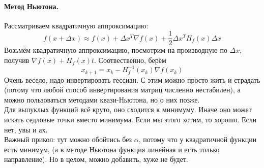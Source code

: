 \documentclass{article}
\begin{document}
    \paragraph{Метод Ньютона.}
    Рассматриваем квадратичную аппроксимацию:
    \[
    f(x+\Delta x)\approx f(x)+\Delta x^T\nabla f(x)+\frac12\Delta x^TH_f(x)\Delta x
    \]
    Возьмём квадратичную аппроксимацию, посмотрим на производную по $\Delta x$, получив $\nabla f(x)+H_f(x)t$. Соотвественно, берём
    \[
    x_{k+1}=x_k-H_f^{-1}(x_k)\nabla f(x_k)
    \]
    Очень весело, надо инвертировать гессиан. С этим можно просто жить и страдать (потому что любой способ инвертирования матриц численно нестабилен), а можно пользоваться методами квази-Ньютона, но о них позже.\\
    Для выпуклых функций всё круто, оно сходится к минимуму. Иначе оно может искать седловые точки вместо минимума. Если мы этого хотим, то хорошо. Если нет, увы и ах.\\
    Важный прикол: тут можно обойтись без $\alpha$, потому что у квадратичной функции есть минимум, (а в методе Ньютона функция линейная и есть только направление). Но в целом, можно добавить, хуже не будет.
\end{document}
